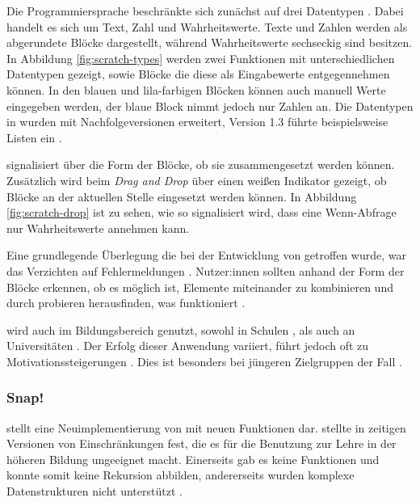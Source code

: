 Die Programmiersprache \Scratch{} beschränkte sich zunächst auf drei Datentypen \parencite{maloneyScratchProgramming2010}. Dabei handelt es sich um Text, Zahl und Wahrheitswerte. Texte und Zahlen werden als abgerundete Blöcke dargestellt, während Wahrheitswerte sechseckig sind besitzen. In Abbildung \ref{fig:scratch-types} werden zwei Funktionen mit unterschiedlichen Datentypen gezeigt, sowie Blöcke die diese als Eingabewerte entgegennehmen können. In den blauen und lila-farbigen Blöcken können auch manuell Werte eingegeben werden, der blaue Block nimmt jedoch nur Zahlen an. Die Datentypen in \Scratch{} wurden mit Nachfolgeversionen erweitert, Version 1.3 führte beispielsweise Listen ein \parencite{harveyBringingNo2010}.

\Scratch{} signalisiert über die Form der Blöcke, ob sie zusammengesetzt werden können. Zusätzlich wird beim \textit{Drag and Drop} über einen weißen Indikator gezeigt, ob Blöcke an der aktuellen Stelle eingesetzt werden können. In Abbildung \ref{fig:scratch-drop} ist zu sehen, wie so signalisiert wird, dass eine Wenn-Abfrage nur Wahrheitswerte annehmen kann.

Eine grundlegende Überlegung die bei der Entwicklung von \Scratch{} getroffen wurde, war das Verzichten auf Fehlermeldungen \parencite{maloneyScratchProgramming2010}. Nutzer:innen sollten anhand der Form der Blöcke erkennen, ob es möglich ist, Elemente miteinander zu kombinieren und durch probieren herausfinden, was funktioniert \parencite{maloneyScratchProgramming2010}.

\Scratch{} wird auch im Bildungsbereich genutzt, sowohl in Schulen \parencite{ortiz-colonTeachingScratch2016}, als auch an Universitäten \parencite{dekerekiScratchApplications2008}. Der Erfolg dieser Anwendung variiert, führt jedoch oft zu Motivationssteigerungen \parencite{dekerekiScratchApplications2008, martinez-valdesRelativelyUnsatisfactory2017}. Dies ist besonders bei jüngeren Zielgruppen der Fall \parencite{ortiz-colonTeachingScratch2016}.

\subsubsection{Snap!}
\Snap{} stellt eine Neuimplementierung von \Scratch{} mit neuen Funktionen dar. \textcite{harveyBringingNo2010} stellte in zeitigen Versionen von \Scratch{} Einschränkungen fest, die es für die Benutzung zur Lehre in der höheren Bildung ungeeignet macht. Einerseits gab es keine Funktionen und konnte somit keine Rekursion abbilden, andererseits wurden komplexe Datenstrukturen nicht unterstützt \parencite{harveyBringingNo2010}.

